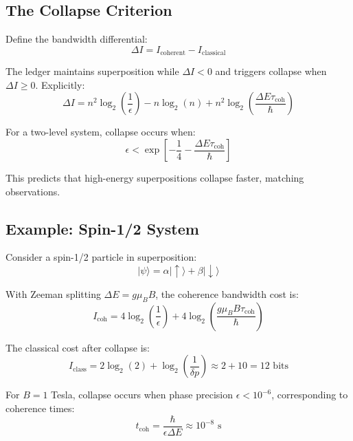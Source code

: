 \documentclass[twocolumn,prd,amsmath,amssymb,aps,superscriptaddress,nofootinbib]{revtex4-2}
\begin{document}
\subsection{The Collapse Criterion}

Define the bandwidth differential:
\begin{equation}
\Delta I = I_{\text{coherent}} - I_{\text{classical}}
\label{eq:deltai}
\end{equation}

The ledger maintains superposition while $\Delta I < 0$ and triggers collapse when $\Delta I \geq 0$. Explicitly:
\begin{equation}
\Delta I = n^2 \log_2\left(\frac{1}{\epsilon}\right) - n \log_2(n) + n^2 \log_2\left(\frac{\Delta E \tau_{\text{coh}}}{\hbar}\right)
\end{equation}

For a two-level system, collapse occurs when:
\begin{equation}
\epsilon < \exp\left[-\frac{1}{4} - \frac{\Delta E \tau_{\text{coh}}}{\hbar}\right]
\label{eq:collapse_condition}
\end{equation}

This predicts that high-energy superpositions collapse faster, matching observations.

\subsection{Example: Spin-1/2 System}

Consider a spin-1/2 particle in superposition:
\begin{equation}
|\psi\rangle = \alpha|\uparrow\rangle + \beta|\downarrow\rangle
\end{equation}

With Zeeman splitting $\Delta E = g\mu_B B$, the coherence bandwidth cost is:
\begin{equation}
I_{\text{coh}} = 4 \log_2\left(\frac{1}{\epsilon}\right) + 4 \log_2\left(\frac{g\mu_B B \tau_{\text{coh}}}{\hbar}\right)
\end{equation}

The classical cost after collapse is:
\begin{equation}
I_{\text{class}} = 2 \log_2(2) + \log_2\left(\frac{1}{\delta p}\right) \approx 2 + 10 = 12 \text{ bits}
\end{equation}

For $B = 1$ Tesla, collapse occurs when phase precision $\epsilon < 10^{-6}$, corresponding to coherence times:
\begin{equation}
t_{\text{coh}} = \frac{\hbar}{\epsilon \Delta E} \approx 10^{-8} \text{ s}
\end{equation}
\end{document}
